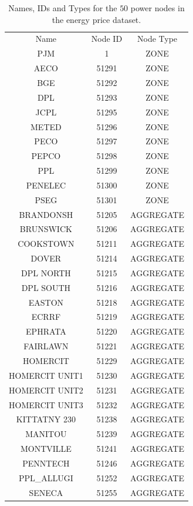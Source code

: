 \begin{table}[htb]
\caption{\small Names, IDs and Types for the $50$ power nodes in the energy price dataset.}
\label{table:data:info}
\centering
{ \small
\begin{tabular}{c c c}
\toprule 
Name &	Node ID 	&	Node Type	\\	
\cmidrule(lr){1-1} \cmidrule(lr){2-2} \cmidrule(lr){3-3}  		
PJM & 1 & ZONE \\
AECO & 51291 & ZONE \\
BGE & 51292 & ZONE \\
DPL & 51293 & ZONE \\
JCPL & 51295 & ZONE \\
METED & 51296 & ZONE \\
PECO & 51297 & ZONE \\
PEPCO & 51298 & ZONE \\
PPL & 51299 & ZONE \\
PENELEC & 51300 & ZONE \\
PSEG & 51301 & ZONE \\
\cmidrule(lr){1-1} \cmidrule(lr){2-2} \cmidrule(lr){3-3}  
BRANDONSH & 51205 & AGGREGATE \\
BRUNSWICK & 51206 & AGGREGATE \\
COOKSTOWN & 51211 & AGGREGATE \\
DOVER & 51214 & AGGREGATE \\
DPL NORTH & 51215 & AGGREGATE \\
DPL SOUTH & 51216 & AGGREGATE \\
EASTON & 51218 & AGGREGATE \\
ECRRF & 51219 & AGGREGATE \\
EPHRATA & 51220 & AGGREGATE \\
FAIRLAWN & 51221 & AGGREGATE \\
HOMERCIT & 51229 & AGGREGATE \\
HOMERCIT UNIT1 & 51230 & AGGREGATE \\
HOMERCIT UNIT2 & 51231 & AGGREGATE \\
HOMERCIT UNIT3 & 51232 & AGGREGATE \\
KITTATNY 230 & 51238 & AGGREGATE \\
MANITOU & 51239 & AGGREGATE \\
MONTVILLE & 51241 & AGGREGATE \\
PENNTECH & 51246 & AGGREGATE \\
PPL\_ALLUGI & 51252 & AGGREGATE \\
SENECA & 51255 & AGGREGATE \\

\end{tabular}}
\end{table}
